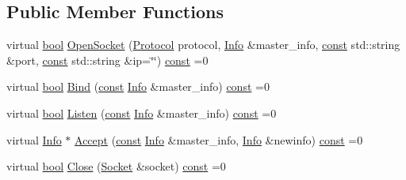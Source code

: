 \subsection*{Public Member Functions}
\begin{DoxyCompactItemize}
\item 
virtual \hyperlink{term__entry_8h_a002004ba5d663f149f6c38064926abac}{bool} \hyperlink{classbpt_1_1_net_abs_1_1_i_net_access_ad81e355a67a36d1049d9cc3cc2a83a07}{Open\-Socket} (\hyperlink{classbpt_1_1_net_abs_1_1_i_net_access_a4464fb7197d6a70c84c93aadaae560f6}{Protocol} protocol, \hyperlink{classbpt_1_1_net_abs_1_1_i_net_access_1_1_info}{Info} \&master\-\_\-info, \hyperlink{term__entry_8h_a57bd63ce7f9a353488880e3de6692d5a}{const} std\-::string \&port, \hyperlink{term__entry_8h_a57bd63ce7f9a353488880e3de6692d5a}{const} std\-::string \&ip=\char`\"{}\char`\"{}) \hyperlink{term__entry_8h_a57bd63ce7f9a353488880e3de6692d5a}{const} =0
\item 
virtual \hyperlink{term__entry_8h_a002004ba5d663f149f6c38064926abac}{bool} \hyperlink{classbpt_1_1_net_abs_1_1_i_net_access_ab4babd68c6e19916da11ab1b9bd24b19}{Bind} (\hyperlink{term__entry_8h_a57bd63ce7f9a353488880e3de6692d5a}{const} \hyperlink{classbpt_1_1_net_abs_1_1_i_net_access_1_1_info}{Info} \&master\-\_\-info) \hyperlink{term__entry_8h_a57bd63ce7f9a353488880e3de6692d5a}{const} =0
\item 
virtual \hyperlink{term__entry_8h_a002004ba5d663f149f6c38064926abac}{bool} \hyperlink{classbpt_1_1_net_abs_1_1_i_net_access_ade0377433ef800f4926fa26f823fee70}{Listen} (\hyperlink{term__entry_8h_a57bd63ce7f9a353488880e3de6692d5a}{const} \hyperlink{classbpt_1_1_net_abs_1_1_i_net_access_1_1_info}{Info} \&master\-\_\-info) \hyperlink{term__entry_8h_a57bd63ce7f9a353488880e3de6692d5a}{const} =0
\item 
virtual \hyperlink{classbpt_1_1_net_abs_1_1_i_net_access_1_1_info}{Info} $\ast$ \hyperlink{classbpt_1_1_net_abs_1_1_i_net_access_a265382fbdec811b69eb6580863fd95b6}{Accept} (\hyperlink{term__entry_8h_a57bd63ce7f9a353488880e3de6692d5a}{const} \hyperlink{classbpt_1_1_net_abs_1_1_i_net_access_1_1_info}{Info} \&master\-\_\-info, \hyperlink{classbpt_1_1_net_abs_1_1_i_net_access_1_1_info}{Info} \&newinfo) \hyperlink{term__entry_8h_a57bd63ce7f9a353488880e3de6692d5a}{const} =0
\item 
virtual \hyperlink{term__entry_8h_a002004ba5d663f149f6c38064926abac}{bool} \hyperlink{classbpt_1_1_net_abs_1_1_i_net_access_a59dd021671ae67a45345e0562b2fd301}{Close} (\hyperlink{classbpt_1_1_net_abs_1_1_i_net_access_ae5a8cad46f8006b85b535f126b697efc}{Socket} \&socket) \hyperlink{term__entry_8h_a57bd63ce7f9a353488880e3de6692d5a}{const} =0

\end{DoxyCompactItemize}

